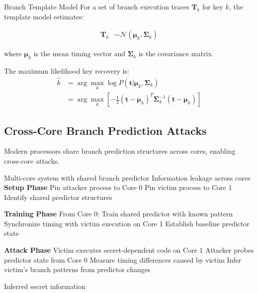 \documentclass[11pt,a4paper]{article}
\theoremstyle{definition}
\begin{document}
\begin{mathematicsbox}{Branch Template Model}
For a set of branch execution traces $\mathbf{T}_k$ for key $k$, the template model estimates:

\begin{align}
\mathbf{T}_k &\sim \mathcal{N}(\boldsymbol{\mu}_k, \boldsymbol{\Sigma}_k)
\end{align}

where $\boldsymbol{\mu}_k$ is the mean timing vector and $\boldsymbol{\Sigma}_k$ is the covariance matrix.

The maximum likelihood key recovery is:
\begin{align}
\hat{k} &= \arg\max_k \log P(\mathbf{t}|\boldsymbol{\mu}_k, \boldsymbol{\Sigma}_k) \\
&= \arg\max_k \left[ -\frac{1}{2}(\mathbf{t} - \boldsymbol{\mu}_k)^T \boldsymbol{\Sigma}_k^{-1} (\mathbf{t} - \boldsymbol{\mu}_k) \right]
\end{align}
\end{mathematicsbox}

\subsection{Cross-Core Branch Prediction Attacks}

Modern processors share branch prediction structures across cores, enabling cross-core attacks.

\begin{algorithm}
\caption{Cross-Core Branch Prediction Attack}
\begin{algorithmic}[1]
\REQUIRE Multi-core system with shared branch predictor
\ENSURE Information leakage across cores
\STATE \textbf{Setup Phase}
\STATE Pin attacker process to Core 0
\STATE Pin victim process to Core 1
\STATE Identify shared predictor structures

\STATE \textbf{Training Phase}
\STATE From Core 0: Train shared predictor with known pattern
\STATE Synchronize timing with victim execution on Core 1
\STATE Establish baseline predictor state

\STATE \textbf{Attack Phase}
    \STATE Victim executes secret-dependent code on Core 1
    \STATE Attacker probes predictor state from Core 0
    \STATE Measure timing differences caused by victim
    \STATE Infer victim's branch patterns from predictor changes
\ENDWHILE

\RETURN Inferred secret information
\end{algorithmic}
\end{algorithm}
\end{document}
